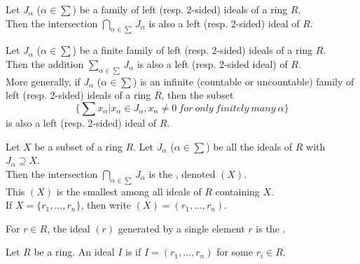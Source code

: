 \begin{corollary}
Let $J_\alpha$ ($\alpha \in \sum$) be a family of left (resp. 2-sided) ideals of a ring $R$.\\
Then the intersection $\bigcap\limits_{\alpha \in \sum}J_\alpha$ is also a left (resp. 2-sided) ideal of $R$.\\
\end{corollary}


\begin{proposition}
Let $J_\alpha$ ($\alpha \in \sum$) be a finite family of left (resp. 2-sided) ideals of a ring $R$.\\
Then the addition $\sum_{\alpha \in \sum} J_\alpha$ is also a left (resp. 2-sided ideal) of $R$.\\
More generally, if $J_\alpha$ ($\alpha \in \sum$) is an infinite (countable or uncountable) family of left (resp. 2-sided) ideals of a ring $R$, then the subset
\begin{equation}
\{\sum x_\alpha | x_\alpha \in J_\alpha, x_\alpha \neq 0 \ for \ only \ finitely \ many \ \alpha\} \nonumber
\end{equation}
is also a left (resp. 2-sided) ideal of $R$.\\
\end{proposition}


\begin{definition}
Let $X$ be a subset of a ring $R$. Let $J_\alpha$ ($\alpha \in \sum$) be all the ideals of $R$ with $J_\alpha \supseteq X$.\\
Then the intersection $\bigcap\limits_{\alpha \in \sum}J_\alpha$ is the , denoted $(X)$.\\
This $(X)$ is the smallest among all ideals of $R$ containing $X$.\\
If $X=\{r_1, \ldots, r_n\}$, then write $(X)=(r_1, \ldots, r_n)$.\\
\end{definition}


\begin{definition}
For $r \in R$, the ideal $(r)$ generated by a single element $r$ is the .\\
\end{definition}


\begin{definition}
Let $R$ be a ring. An ideal $I$ is  if $I=(r_1, \ldots, r_n)$ for some $r_i \in R$.\\
\end{definition}


